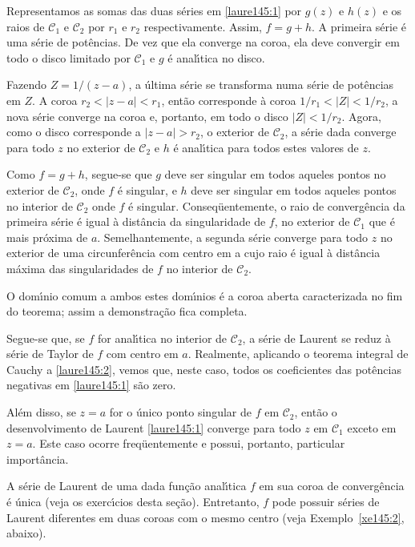 Representamos as somas das duas s\'{e}ries em \eqref{laure145:1} por
$g(z)$ e $h(z)$ e os raios de $\mathcal{C}_1$ e $\mathcal{C}_2$
por $r_1$ e $r_2$ respectivamente. Assim, $f = g + h$. A primeira
s\'{e}rie \'{e} uma s\'{e}rie de pot\^{e}ncias. De vez que ela converge na coroa,
ela deve convergir em todo o disco limitado por $\mathcal{C}_1$ e
$g$ \'{e} anal\'{\i}tica no disco.

Fazendo $Z = 1/(z - a)$, a \'{u}ltima s\'{e}rie se transforma numa s\'{e}rie
de pot\^{e}ncias em $Z$. A coroa $r_2 <| z - a | < r_1$, ent\~{a}o
corresponde \`{a} coroa $1/r_1 < | Z| < 1/r_2$, a nova s\'{e}rie converge
na coroa e, portanto, em todo o disco $| Z | < 1/r_2$. Agora, como
o disco corresponde a $|z- a| > r_2$, o exterior de
$\mathcal{C}_2$, a s\'{e}rie dada converge para todo $z$ no exterior
de $\mathcal{C}_2$ e $h$ \'{e} anal\'{\i}tica para todos estes valores de
$z$.

Como $f = g + h$, segue-se que $g$ deve ser singular em todos
aqueles pontos no exterior de $\mathcal{C}_2$, onde $f$ \'{e}
singular, e $h$ deve ser singular em todos aqueles pontos no
interior de $\mathcal{C}_2$ onde $f$ \'{e} singular. Conseq\"{u}entemente,
o raio de converg\^{e}ncia da primeira s\'{e}rie \'{e} igual \`{a} dist\^{a}ncia da
singularidade de $f$, no exterior de $\mathcal{C}_1$ que \'{e} mais
pr\'{o}xima de $a$. Semelhantemente, a segunda s\'{e}rie converge para
todo $z$ no exterior de uma circunfer\^{e}ncia com centro em a cujo
raio \'{e} igual \`{a} dist\^{a}ncia m\'{a}xima das singularidades de $f$ no
interior de $\mathcal{C}_2$.

O dom\'{\i}nio comum a ambos estes dom\'{\i}nios \'{e} a coroa aberta caracterizada
no fim do teorema; assim a demonstra\c{c}\~{a}o fica completa.

Segue-se que, se $f$ for anal\'{\i}tica no interior de
$\mathcal{C}_2$, a s\'{e}rie de Laurent se reduz \`{a} s\'{e}rie de Taylor de
$f$ com centro em $a$. Realmente, aplicando o teorema integral
de Cauchy a \eqref{laure145:2}, vemos que, neste caso, todos os
coeficientes das pot\^{e}ncias negativas em \eqref{laure145:1} s\~{a}o
zero.

Al\'{e}m disso, se $z = a$ for o \'{u}nico ponto singular de $f$ em
$\mathcal{C}_2$, ent\~{a}o o desenvolvimento de Laurent
\eqref{laure145:1} converge para todo $z$ em $\mathcal{C}_1$
exceto em $z = a$. Este caso ocorre freq\"{u}entemente e possui,
portanto, particular import\^{a}ncia.

A s\'{e}rie de Laurent de uma dada fun\c{c}\~{a}o anal\'{\i}tica $f$ em sua
coroa de converg\^{e}ncia \'{e} \'{u}nica (veja os exerc\'{\i}cios desta se\c{c}\~{a}o).
Entretanto, $f$ pode possuir s\'{e}ries de Laurent diferentes em
duas coroas com o mesmo centro (veja  Exemplo~\ref{xe145:2},
abaixo).

